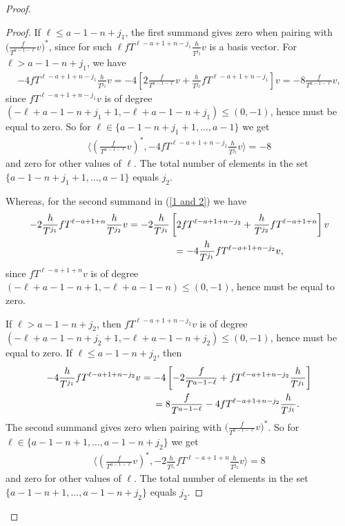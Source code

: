 \begin{proof}
\begin{proof}
If $\ell \leq a-1-n+j_1$, the first summand gives zero when pairing with $\big(\frac{f}{T^{a-1-\ell}}v\big)^*$, since for such $\ell fT^{\ell-a+1+n-j_1} \frac{h}{T^{j_2}} v$ is a basis vector. For $\ell > a-1-n+j_1$, we have
\begin{gather*}
-4 fT^{\ell-a+1+n-j_1} \frac{h}{T^{j_2}} v = -4 \left[ 2 \frac{f}{T^{a-1-\ell}} v + \frac{h}{T^{j_2}} fT^{\ell-a+1+n-j_1} \right] v= -8 \frac{f}{T^{a-1-\ell}} v,
\end{gather*}
since $fT^{\ell-a+1+n-j_1}v$ is of degree $(-\ell+a-1-n + j_1 +1, -\ell+a-1-n+j_1) \leq (0, -1)$, hence must be equal to zero. So for $\ell \in \{a-1-n+j_1 +1, \dots, a-1\}$ we get
\begin{gather*}
\bigg\langle \left(\frac{f}{T^{a-1-\ell}}v\right)^*, -4 fT^{\ell-a+1+n-j_1} \frac{h}{T^{j_2}} v \bigg\rangle = -8
\end{gather*}
and zero for other values of $\ell$. The total number of elements in the set $\{a-1-n+j_1 +1, \dots, a-1\}$ equals $j_2$.

Whereas, for the second summand in (\ref{1 and 2}) we have
\begin{gather*}
-2 \frac{h}{T^{j_1}} fT^{\ell-a+1+n} \frac{h}{T^{j_2}} v = -2\frac{h}{T^{j_1}} \left[ 2 fT^{\ell-a+1+n - j_2} + \frac{h}{T^{j_2}} fT^{\ell-a+1+n} \right] v \\
\hphantom{-2 \frac{h}{T^{j_1}} fT^{\ell-a+1+n} \frac{h}{T^{j_2}} v } = -4 \frac{h}{T^{j_1}} fT^{\ell-a+1+n -j_2} v,
\end{gather*}
since $fT^{\ell-a+1+n} v$ is of degree $(-\ell+a-1-n+1, -\ell+a-1-n) \leq (0, -1)$, hence must be equal to zero.

If $\ell > a-1-n+j_2$, then $fT^{\ell-a+1+n-j_2} v$ is of degree $(-\ell+a-1-n+j_2 +1, -\ell+a-1-n+j_2) \leq (0, -1)$, hence must be equal to zero. If $\ell \leq a-1-n+j_2$, then
\begin{gather*}
-4 \frac{h}{T^{j_1}} fT^{\ell-a+1+n -j_2} v = -4 \left[ -2\frac{f}{T^{a-1-\ell}} + fT^{\ell-a+1+n - j_2} \frac{h}{T^{j_1}} \right] \\
\hphantom{-4 \frac{h}{T^{j_1}} fT^{\ell-a+1+n -j_2} v} = 8 \frac{f}{T^{a-1-\ell}} -4 fT^{\ell-a+1+n - j_2} \frac{h}{T^{j_1}}.
\end{gather*}
The second summand gives zero when pairing with $\big(\frac{f}{T^{a-1-\ell}}v\big)^*$. So for $\ell \in \{a-1-n+1, \dots, a-1-n+j_2 \}$ we get
\begin{gather*}
\bigg\langle \left(\frac{f}{T^{a-1-\ell}}v\right)^*, -2 \frac{h}{T^{j_1}} fT^{\ell-a+1+n} \frac{h}{T^{j_2}} v \bigg\rangle = 8
\end{gather*}
and zero for other values of $\ell$. The total number of elements in the set $\{a-1-n+1, \dots, a-1-n+j_2 \}$ equals $j_2$.


\end{proof}
\end{proof}
